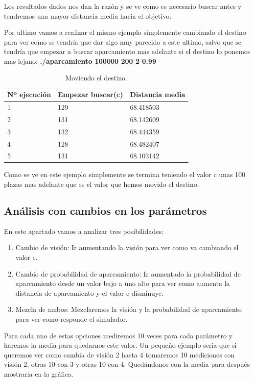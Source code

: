\documentclass[]{article}
\begin{document}
Los resultados dados nos dan la razón y se ve como es necesario buscar antes y tendremos una mayor distancia media hacia el objetivo.

Por ultimo vamos a realizar el mismo ejemplo simplemente cambiando el destino para ver como se tendría que dar algo muy parecido a este ultimo, salvo que se tendría que empezar a buscar aparcamiento mas adelante si el destino lo ponemos mas lejano: 
\textbf{./aparcamiento 100000 200 2 0.99}
 \begin{table}[htbp]
	\begin{center}
		\begin{tabular}{|l|l|l|}
			\hline
			Nº ejecución & Empezar buscar(c) & Distancia media \\
			\hline \hline
			1 & 129&68.418503
			\\ \hline
			2 & 131&68.142609
			\\ \hline
			3 & 132&68.444359
			\\ \hline
			4 & 128&68.482407
			\\ \hline
			5 & 131&68.103142
			\\ \hline
		\end{tabular}
		\caption{Moviendo el destino.}
		\label{tabla:sencilla}
	\end{center}
\end{table}

Como se ve en este ejemplo simplemente se termina teniendo el valor c unas 100 plazas mas adelante que es el valor que hemos movido el destino. 

\subsection{Análisis con cambios en los parámetros}
En este apartado vamos a analizar tres posibilidades:
\begin{enumerate}
	\item Cambio de visión: Ir aumentando la visión para ver como va cambiando el valor c.
	\item Cambio de probabilidad de aparcamiento: Ir aumentado la probabilidad de aparcamiento desde un valor bajo a uno alto para ver como aumenta la distancia de aparcamiento y el valor c disminuye.
	\item Mezcla de ambos: Mezclaremos la visión y la probabilidad de aparcamiento para ver como responde el simulador.
\end{enumerate}

Para cada uno de estas opciones mediremos 10 veces para cada parámetro y haremos la media para quedarnos este valor. Un pequeño ejemplo seria que si queremos ver como cambia de visión 2 hasta 4 tomaremos 10 mediciones con visión 2, otras 10 con 3 y otras 10 con 4. Quedándonos con la media para después mostrarla en la gráfica.
\end{document}
